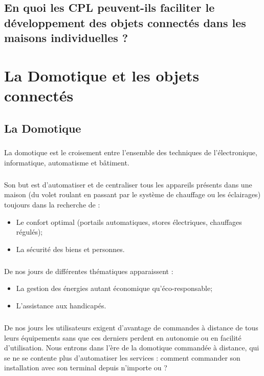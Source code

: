     \section*{En quoi les CPL peuvent-ils faciliter le développement des objets connectés dans les maisons individuelles ?}



\chapter{La Domotique et les objets connectés}
    \section{La Domotique}
        \paragraph{}
La domotique est le croisement entre l’ensemble des techniques de l’électronique, informatique, automatisme et bâtiment.
        \paragraph{}
Son but est d’automatiser et de centraliser tous les appareils présents dans une maison
(du volet roulant en passant par le système de chauffage ou les éclairages) toujours dans la recherche de :
            \begin{itemize}
                \item Le confort optimal (portails automatiques, stores électriques, chauffages régulés);
                \item La sécurité des biens et personnes.
            \end{itemize}
        \paragraph{}
De nos jours de différentes thématiques apparaissent :
            \begin{itemize}
                \item La gestion des énergies autant économique qu'éco-responsable;
                \item L'assistance aux handicapés.
            \end{itemize}
        \paragraph{}
De nos jours les utilisateurs exigent d'avantage de commandes à distance de tous leurs équipements sans que ces derniers perdent en autonomie ou en facilité d'utilisation.
Nous entrons dans l’ère de la domotique commandée à distance, qui se ne se contente plus d'automatiser les services :
comment commander son installation avec son terminal depuis n'importe ou ?
